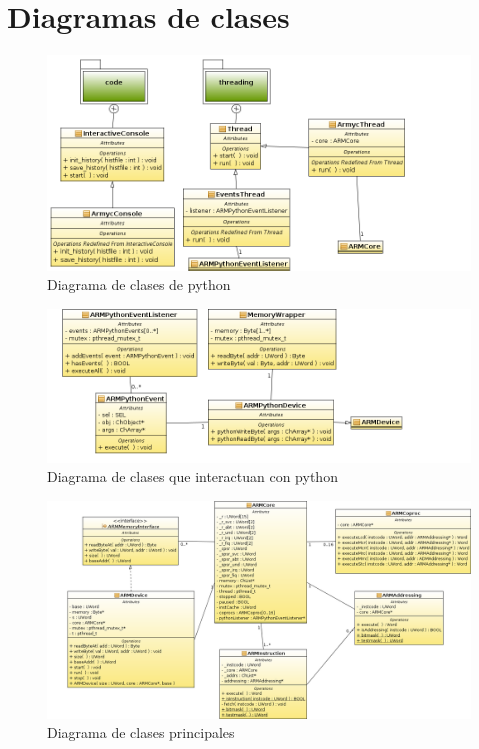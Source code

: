 \chapter{Diagramas de clases}\label{ch:clases}


\begin{figure}[!h]

\includegraphics[scale=0.5]{img/PythonClasses.png}\caption{Diagrama de clases de python}
\label{Flo:clases_python}

\end{figure}

\begin{figure}

\includegraphics[scale=0.5]{img/PythonHelperClasses.png}\caption{Diagrama de clases que interactuan con python}
\label{Flo:clases_helper_python}

\end{figure}

\begin{figure}

\includegraphics[scale=0.5,angle=90]{img/CoreClasses.png}\caption{Diagrama de clases principales}
\label{Flo:clases_principal}

\end{figure}

